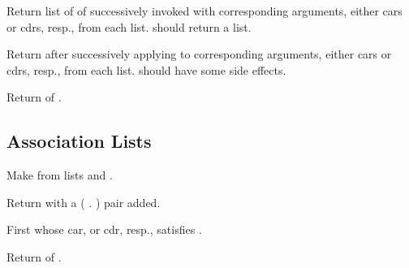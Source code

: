 \begin{LIST}{1cm}
  {
  Return list of 
   of
   successively invoked with corresponding arguments,
  either cars or cdrs, resp.,
  from each list.  should return a list.
  }

  {
  Return  after successively applying
   to corresponding arguments, either cars or cdrs,
  resp., from each list.  should have some side
  effects. 
  }

  {
  Return  of .
  }

\end{LIST}


\subsection{Association Lists} 
\label{section:Association Lists}
\begin{LIST}{1cm}

  {
  Make  from lists  and .
  }

  {
  Return  with a ( . ) pair added.
  }

  {
  First  whose car, or cdr, resp., satisfies .
  }

  {
  Return  of .
  }

\end{LIST}



